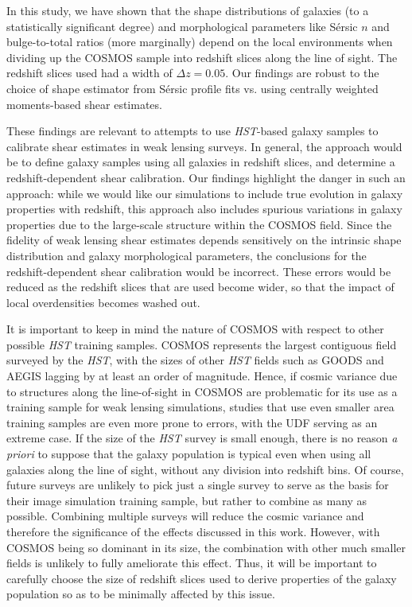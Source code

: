 \documentclass[twocolumn,useAMS,usenatbib]{mn2e}
\newcommand{\sersic}{S\'{e}rsic }
\begin{document}
In this study, we have shown that the shape distributions of galaxies
(to a statistically significant degree) and morphological parameters
like \sersic $n$ and bulge-to-total ratios (more marginally) depend on
the local environments when dividing up the COSMOS sample into
redshift slices along the line of sight.  The redshift slices used had
a width of $\Delta z=0.05$.  Our findings are robust to the choice of
shape estimator from \sersic profile fits vs. using centrally weighted
moments-based shear estimates.

These findings are relevant to attempts to use {\em HST}-based galaxy
samples to calibrate shear estimates in weak lensing surveys.  In
general, the approach would be to define galaxy samples using all
galaxies in redshift slices, and determine a redshift-dependent shear
calibration.  Our findings highlight the danger in such an approach:
while we would like our simulations to include true evolution in
galaxy properties with redshift, this approach also includes spurious
variations in galaxy properties due to the large-scale structure
within the COSMOS field.  Since the fidelity of weak lensing shear
estimates depends sensitively on the intrinsic shape distribution and
galaxy morphological parameters, the conclusions for the
redshift-dependent shear calibration would be incorrect.  These errors
would be reduced as the redshift slices that are used become wider, so
that the impact of local overdensities becomes washed out.

It is important to keep in mind the nature of COSMOS with respect to
other possible {\em HST} training samples.  COSMOS represents the
largest contiguous field surveyed by the {\em HST}, with the sizes of
other {\em HST} fields such as GOODS and AEGIS lagging by at least an
order of magnitude.  Hence, if cosmic variance due to structures along
the line-of-sight in COSMOS are problematic for its use as a training
sample for weak lensing simulations, studies that use even smaller
area training samples are even more prone to errors, with the UDF
serving as an extreme case.  If the size of the {\em HST} survey is
small enough, there is no reason {\em a priori} to suppose that the
galaxy population is typical even when using all galaxies along the
line of sight, without any division into redshift bins.  Of course,
future surveys are unlikely to pick just a single survey to serve as
the basis for their image simulation training sample, but rather
to combine as many as possible.  Combining multiple surveys will
reduce the cosmic variance and therefore the significance of the
effects discussed in this work.  However, with COSMOS being so
dominant in its size, the combination with other much smaller fields
is unlikely to fully ameliorate this effect.  Thus, it will be
important to carefully choose the size of redshift slices used to
derive properties of the galaxy population so as to be minimally
affected by this issue.
\end{document}
